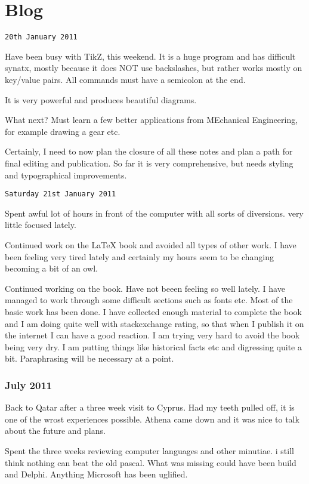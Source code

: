 \chapter{Blog}

\texttt{20th January 2011}

Have been busy with TikZ, this weekend. It is a huge program and has difficult synatx, mostly because it does NOT use backslashes, but rather works mostly on key/value pairs. All commands must have a semicolon at the end.

It is very powerful and produces beautiful diagrams.

What next? Must learn a few better applications from MEchanical Engineering, for example drawing a gear etc. 

Certainly, I need to now plan the closure of all these notes and plan a path for final editing and publication. So far it is very comprehensive, but needs styling and typographical improvements.

\texttt{Saturday 21st January 2011}

Spent awful lot of hours in front of the computer with all sorts of diversions. very little focused lately.

Continued work on the LaTeX book and avoided all types of other work. I have been feeling very tired lately and certainly my hours seem to be changing becoming a bit of an owl.


Continued working on the book. Have not beeen feeling so well lately. I have managed to work through some difficult sections such as fonts etc. Most of the basic work has been done. I have collected enough material to complete the book and I am doing quite well with stackexchange rating, so that when I publish it on the internet I can have a good reaction. I am trying very hard to avoid the book being very dry. I am putting things like historical facts etc and digressing quite a bit. Paraphrasing will be necessary at a point.

\subsection{July 2011}

Back to Qatar after a three week visit to Cyprus. Had my teeth pulled off, it is one of the wrost experiences possible. Athena came down and it was nice to talk about the future and plans. 

Spent the three weeks reviewing computer languages and other minutiae. i still think nothing can beat the old pascal. What was missing could have been build and Delphi. Anything Microsoft has been uglified.


